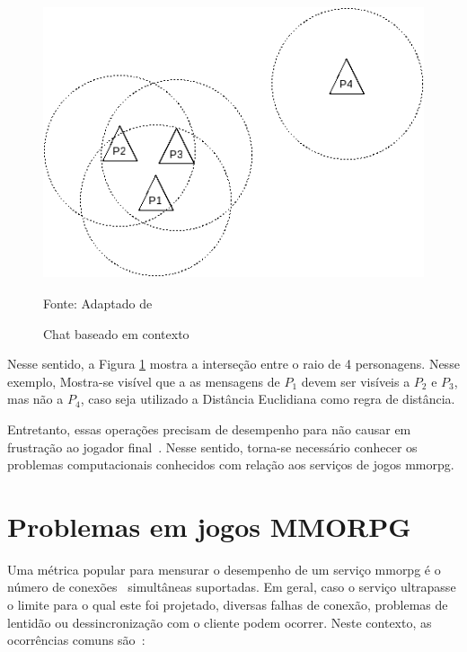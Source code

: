 \begin{figure}[htb!]
\caption{Chat baseado em contexto}
\label{fig:chat}
\includegraphics[height=8cm]{img/cap2/chat.png}
\centering

Fonte: Adaptado de ~\cite{albion_online_unite}
\end{figure}



Nesse sentido, a Figura \ref{fig:chat} mostra a interseção entre o raio de 4 personagens. Nesse exemplo, Mostra-se visível que a as mensagens de $P_1$ devem ser visíveis a $P_2$ e $P_3$, mas não a $P_4$, caso seja utilizado a Distância Euclidiana como regra de distância.


Entretanto, essas operações precisam de desempenho para não causar em frustração ao jogador final~\cite{7008965}.
%
Nesse sentido, torna-se necessário conhecer os problemas computacionais conhecidos com relação aos serviços de jogos \ac{mmorpg}.

\section{Problemas em jogos MMORPG}
\label{sec:problemas}

Uma métrica popular para mensurar o desempenho de um serviço \ac{mmorpg} é o número de conexões~\cite{1417630} simultâneas suportadas.
%
Em geral, caso o serviço ultrapasse o limite para o qual este foi projetado, diversas falhas de conexão, problemas de lentidão ou dessincronização com o cliente podem ocorrer.
%
Neste contexto, as ocorrências comuns são~\cite{1417630}:

